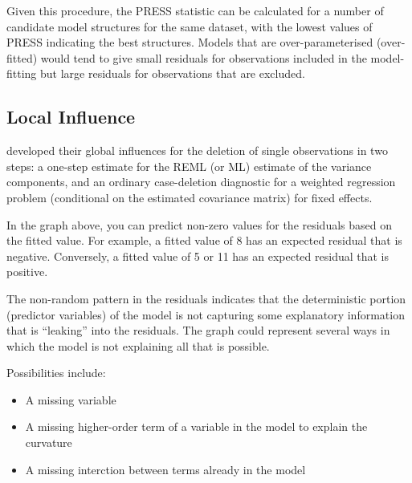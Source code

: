 \documentclass[12pt, a4paper]{report}
\theoremstyle{plain}
\theoremstyle{definition}
\theoremstyle{remark}
\begin{document}
Given this procedure, the PRESS statistic can be calculated for a number of candidate model structures for the same dataset, with the lowest values of PRESS indicating the best structures. Models that are over-parameterised (over-fitted) would tend to give small residuals for observations included in the model-fitting but large residuals for observations that are excluded.





\subsection{Local Influence}

\citet{Christensen} developed their global influences for the deletion of single observations in two steps: a one-step estimate for the REML (or ML) estimate of the variance components, and an ordinary case-deletion diagnostic for a weighted regression problem (conditional on the estimated covariance matrix) for fixed effects.


	
	
	
	In the graph above, you can predict non-zero values for the residuals based on the fitted value. For example, a fitted value of 8 has an expected residual that is negative. Conversely, a fitted value of 5 or 11 has an expected residual that is positive.
	
	The non-random pattern in the residuals indicates that the deterministic portion (predictor variables) of the model is not capturing some explanatory information that is “leaking” into the residuals. The graph could represent several ways in which the model is not explaining all that is possible. 
	
	Possibilities include:
	
	\begin{itemize}
		\item A missing variable
		\item A missing higher-order term of a variable in the model to explain the curvature
		\item A missing interction between terms already in the model
	\end{itemize}
	
\end{document}

